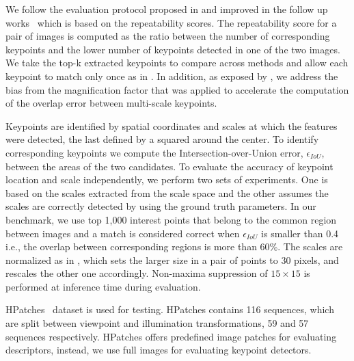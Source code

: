 We follow the evaluation protocol proposed in \cite{mikolajczykpami2005} and improved in the follow up works~\cite{LIFT,Karel_Vedaldi_ECCV_16,Zhang_Felix_CVPR_17,Karel_Vedaldi_BMVC_18} which is based on the repeatability scores. The repeatability score for a pair of images is computed as the ratio between the number of corresponding keypoints and the lower number of keypoints detected in one of the two images. We take the top-k extracted keypoints to compare across methods and allow each keypoint to match only once as in \cite{FASTER, TILDE}. In addition, as exposed by \cite{Karel_Vedaldi_BMVC_18}, we address the bias from the magnification factor that was applied to accelerate the computation of the overlap error between multi-scale keypoints.

Keypoints are identified by spatial coordinates and scales at which the features were detected, the last defined by a squared around the center.  To identify corresponding keypoints we compute the Intersection-over-Union error, $\epsilon_{IoU}$, between the areas of the two candidates. To evaluate the accuracy of keypoint location and scale independently, we perform two sets of experiments. One is based on the scales extracted from the scale space and the other assumes the scales are correctly detected by using the ground truth parameters. In our benchmark, we use top 1,000 interest points that belong to the common region between images and a match is considered correct when $\epsilon_{IoU}$ is smaller than 0.4 i.e., the overlap between corresponding regions is more than 60\%. The scales are normalized as in \cite{Karel_Vedaldi_BMVC_18}, which sets the larger size in a pair of points to 30 pixels, and rescales the other one accordingly. Non-maxima suppression of $15 \times 15$ is performed at inference time during evaluation.

HPatches~\cite{HPatches} dataset is used for testing. HPatches contains 116 sequences, which are split between viewpoint and illumination transformations, 59 and 57 sequences respectively. HPatches offers predefined image patches for evaluating descriptors, instead, we use full images for evaluating keypoint detectors. 


